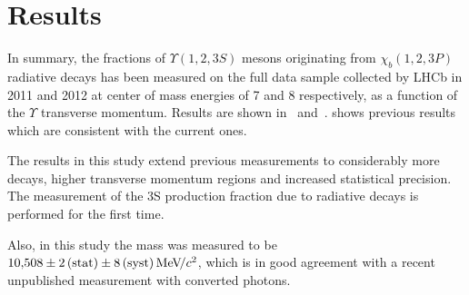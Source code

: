 \section{Results}
\label{sec:results}

In summary, the fractions of $\Upsilon(1,2,3S)$ mesons originating from $\chi_b(1,2,3P)$ 
radiative decays has been measured on the full data sample collected by LHCb in 2011 and 2012 
at center of mass energies of 7 and 8 \tev respectively, as a function of the $\Upsilon$ 
transverse momentum. Results are shown in~
and~.
 shows previous \lhcb results which
are consistent with the current ones.






The results in this study extend previous \lhcb measurements to considerably
more decays, higher transverse momentum regions and increased statistical
precision. The measurement of the 
\Y3S production fraction due to radiative \chibThreeP decays is performed for the first time.

Also, in this study the \chiboneThreeP mass was measured to be $10{,}508 \pm 2\mathrm{\,(stat)} \pm 8\mathrm{\,(syst)} {\mathrm{\,Me\kern -0.1em V\!/}c^2}$, 
which is in good agreement with a recent unpublished \lhcb measurement with converted photons.


